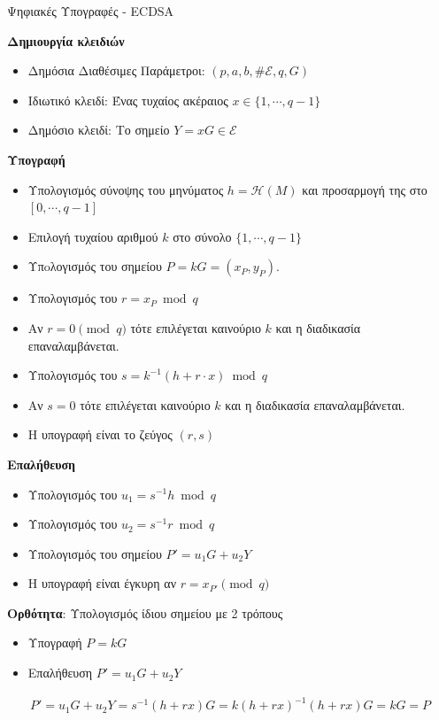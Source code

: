 \documentclass[handout]{beamer}
\begin{document}
\begin{frame}[allowframebreaks]{Ψηφιακές Υπογραφές - ECDSA}

\textbf{Δημιουργία κλειδιών }
\begin{itemize}
\item Δημόσια Διαθέσιμες Παράμετροι: $(p,a,b,\# \mathcal{E},q,G)$
\item Ιδιωτικό κλειδί: Ένας τυχαίος ακέραιος $x \in \{1, \cdots, q-1 \}$
\item Δημόσιο κλειδί: Το σημείο $Y=xG \in \mathcal{E}$
\end{itemize}

\framebreak

\textbf{Υπογραφή}
\begin{itemize}
\item Υπολογισμός σύνοψης του μηνύματος $h = \mathcal{H}(M)$ και προσαρμογή της στο $[ 0, \cdots, q-1 ]$
\item Επιλογή τυχαίου αριθμού $k$ στο σύνολο $\{ 1, \cdots, q-1 \}$
\item Υπoλογισμός του σημείου $P=kG=(x_P,y_P)$.
\item Υπολογισμός του $r = x_P \bmod q$
\item \alert{Αν $r = 0 \pmod{q}$ τότε επιλέγεται καινούριο $k$ και η διαδικασία επαναλαμβάνεται}.
\item Υπολογισμός του $s = k^{-1} (h + r \cdot x) \bmod{q}$
\item \alert{Αν $s=0$ τότε επιλέγεται καινούριο $k$ και η διαδικασία επαναλαμβάνεται}.
\item Η υπογραφή είναι το ζεύγος $(r,s)$
\end{itemize}

\framebreak

\textbf{Επαλήθευση}
\begin{itemize}
\item Υπολογισμός του $u_1 = s^{-1} h \bmod{q}$
\item Υπολογισμός του $u_2 = s^{-1} r \bmod{q}$
\item Υπολογισμός του σημείου $P' = u_1 G + u_2 Y$
\item H υπογραφή είναι έγκυρη αν $r = x_{P' } \pmod{q}$ 
\end{itemize}

\medskip
\medskip

\textbf{Ορθότητα}: Υπολογισμός ίδιου σημείου με 2 τρόπους

\begin{itemize}
\item Υπογραφή $P=kG$
\item Επαλήθευση $P' = u_1 G + u_2 Y $
\end{itemize}
\begin{align*}
P' = u_1 G + u_2 Y = s^{-1} (h+rx) G = k(h+rx)^{-1}(h+rx)G = kG = P
\end{align*}

\end{frame}
\end{document}
